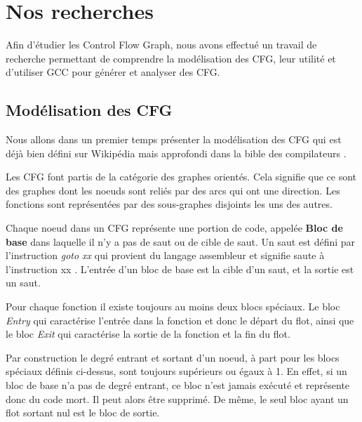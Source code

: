 \section{Nos recherches}

Afin d'étudier les Control Flow Graph, nous avons effectué un travail de recherche permettant de comprendre la modélisation des CFG, leur utilité et d'utiliser GCC pour générer et analyser des CFG. 

\subsection{Modélisation des CFG}
Nous allons dans un premier temps présenter la modélisation des CFG qui est déjà bien défini sur Wikipédia \cite{wiki:Graphe_de_flot_de_controle} mais approfondi dans la bible des compilateurs \cite{compilateurs}.

Les CFG font partis de la catégorie des graphes orientés. Cela signifie que ce sont des graphes dont les noeuds sont reliés par des arcs qui ont une direction. Les fonctions sont représentées par des sous-graphes disjoints les uns des autres.

Chaque noeud dans un CFG représente une portion de code, appelée \textbf{Bloc de base} dans laquelle il n'y a pas de saut ou de cible de saut. Un saut est défini par l'instruction \textit{goto xx} qui provient du langage assembleur et signifie \og saute à l'instruction xx \fg{}. L'entrée d'un bloc de base est la cible d'un saut, et la sortie est un saut.


Pour chaque fonction il existe toujours au moins deux blocs spéciaux. Le bloc \textit{Entry} qui caractérise l'entrée dans la fonction et donc le départ du flot, ainsi que le bloc \textit{Exit} qui caractérise la sortie de la fonction et la fin du flot.

Par construction le degré entrant et sortant d'un noeud, à part pour les blocs spéciaux définis ci-dessus, sont toujours supérieurs ou égaux à 1. En effet, si un bloc de base n'a pas de degré entrant, ce bloc n'est jamais exécuté et représente donc du code mort. Il peut alors être supprimé. De même, le seul bloc ayant un flot sortant nul est le bloc de sortie. 

